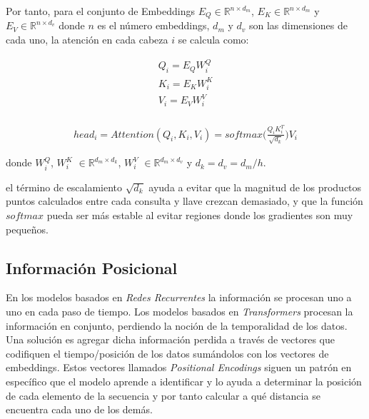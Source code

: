 Por tanto, para el conjunto de Embeddings  $E_Q \in \mathbb{R}^{n \times d_m}$,
$E_K \in \mathbb{R}^{n \times d_m}$ y $E_V \in \mathbb{R}^{n \times d_v}$ donde $n$ es el número
embeddings, $d_m$ y $d_v$ son las dimensiones de cada uno, la atención en cada cabeza $i$ se calcula
como:

\begin{equation}
    \begin{split}
        Q_i = E_Q W_i^Q\\
        K_i = E_K W_i^K\\
        V_i = E_V W_i^V\\
    \end{split}
\end{equation}

\begin{equation}
\begin{split}
    head_i = Attention(Q_i, K_i, V_i) = softmax\Big(\frac{Q_i K_i^T}{\sqrt{d_k}}\Big) V_i
    \label{eq:trans_att}
\end{split}
\end{equation}

donde $W_i^Q$, $W_i^K$ $\in \mathbb{R}^{d_m \times d_k}$, $W_i^V$ $\in \mathbb{R}^{d_m \times d_v}$
y $d_k=d_v=d_m/h$.

el término de escalamiento $\sqrt{d_k}$ ayuda a evitar que la magnitud de los productos puntos calculados
entre cada consulta y llave crezcan demasiado, y que la función $softmax$ pueda ser más estable al evitar
regiones donde los gradientes son muy pequeños\cite{Vaswani}.


\subsection{Información Posicional}

En los modelos basados en \textit{Redes Recurrentes} la información se procesan uno a uno en cada paso de
tiempo. Los modelos basados en \textit{Transformers} procesan la información en conjunto, perdiendo
la noción de la temporalidad de los datos. Una solución es agregar dicha información perdida a través
de vectores que codifiquen el tiempo/posición de los datos sumándolos con los vectores de embeddings.
Estos vectores llamados \textit{Positional Encodings} \cite{DBLP:journals/corr/GehringAGYD17} siguen
un patrón en específico
que el modelo aprende a identificar y lo ayuda a determinar la posición de cada elemento de la secuencia
y por tanto calcular a qué distancia se encuentra cada uno de los demás.

